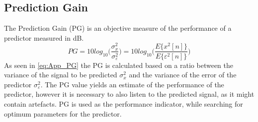\subsection{Prediction Gain}
The Prediction Gain (PG) is an objective measure of the performance of a predictor measured in dB. 
\begin{equation}\label{eq:App_PG}
PG = 10 log_{10}\bigg(\frac{\sigma^2_x}{\sigma^2_\varepsilon}\bigg) = 10 log_{10}\bigg(\frac{E\{x^2[n]\}}{E\{\varepsilon^2[n]\}}\bigg)
\end{equation}
As seen in \autoref{eq:App_PG} the PG is calculated based on a ratio between the variance of the signal to be predicted $\sigma^2_x$ and the variance of the error of the predictor $\sigma^2_\varepsilon$. The PG value yields an estimate of the performance of the predictor, however it is necessary to also listen to the predicted signal, as it might contain artefacts. PG is used as the performance indicator, while searching for optimum parameters for the predictor.  


%	

%	





















